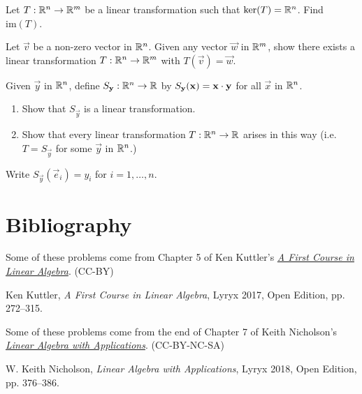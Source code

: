 \documentclass{ximera}
\begin{document}
\begin{problem}\label{prob:imAndKer0}
    Let $T:\mathbb{R}^n\rightarrow \mathbb{R}^m$ be a linear transformation such that $\text{ker}(T)=\mathbb{R}^n$.  Find $\text{im}(T)$.
\end{problem}

\begin{problem}\label{prob:nich7.1.13}
    Let $\vec{v}$ be a non-zero vector in $\mathbb{R}^n$.  Given any vector $\vec{w}$ in $\mathbb{R}^m$, show there exists a linear transformation $T:\mathbb{R}^n\rightarrow\mathbb{R}^m$ with $T(\vec{v})=\vec{w}$.
\end{problem}

\begin{problem}\label{prob:nich7.1.14}
    Given $\vec{y}$ in $\mathbb{R}^n$, define $S_{\mathbf{y}}:\mathbb{R}^n\rightarrow\mathbb{R}$ by $S_{\mathbf{y}}(\mathbf{x})=\mathbf{x}\cdot\mathbf{y}$ for all $\vec{x}$ in $\mathbb{R}^n$.  
    \begin{enumerate}
        \item Show that $S_{\vec{y}}$ is a linear transformation.
        \item Show that every linear transformation $T:\mathbb{R}^n\rightarrow\mathbb{R}$  arises in this way (i.e. $T=S_{\vec{y}}$ for some $\vec{y}$ in $\mathbb{R}^n$.)
    \end{enumerate}
    \begin{hint}
        Write $S_{\vec{y}}(\vec{e}_i)=y_i$ for $i=1,\dots , n$.
    \end{hint}
    
\end{problem}




\section*{Bibliography}
Some of these problems come from Chapter 5 of Ken Kuttler's \href{https://open.umn.edu/opentextbooks/textbooks/a-first-course-in-linear-algebra-2017}{\it A First Course in Linear Algebra}. (CC-BY)

Ken Kuttler, {\it  A First Course in Linear Algebra}, Lyryx 2017, Open Edition, pp. 272--315.   

Some of these problems come from the end of Chapter 7 of Keith Nicholson's \href{https://open.umn.edu/opentextbooks/textbooks/linear-algebra-with-applications}{\it Linear Algebra with Applications}. (CC-BY-NC-SA)

W. Keith Nicholson, {\it Linear Algebra with Applications}, Lyryx 2018, Open Edition, pp. 376--386. 
\end{document}
